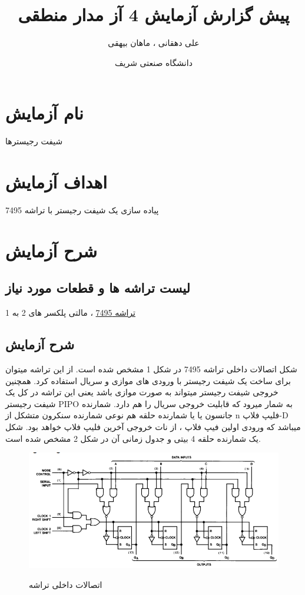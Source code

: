 \documentclass[twoside]{article}
\title{\Huge پیش گزارش آزمایش 4 آز مدار منطقی }
\author{\Large علی دهقانی ، ماهان بیهقی}
\date{دانشگاه صنعتی شریف}
\begin{document}
	\maketitle
	\newpage
	\section*{نام آزمایش}
	شیفت رجیسترها
	
	\section*{اهداف آزمایش}
	پیاده سازی یک شیفت رجیستر با تراشه 7495
	
	\section*{شرح آزمایش}
	
	\subsection*{لیست تراشه ها و قطعات مورد نیاز}
	\href{https://www.jameco.com/Jameco/Products/ProdDS/50770NSC.pdf}{تراشه 7495} ، مالتی پلکسر های 2 به 1
	
	\subsection*{شرح آزمایش}
	
	شکل اتصالات داخلی تراشه 7495 در شکل 1 مشخص شده است. از این تراشه میتوان برای ساخت یک شیفت رجیستر با ورودی های موازی و سریال استفاده کرد. همچنین خروجی شیفت رجیستر میتواند به صورت موازی باشد یعنی این تراشه در کل یک شیفت رجیستر PIPO به شمار میرود که قابلیت خروجی سریال را هم دارد.
	شمارنده جانسون یا یا شمارنده حلقه هم نوعی شمارنده سنکرون متشکل از n فلیپ فلاپ-D میباشد که ورودی اولین فیپ فلاپ ، از نات خروجی آخرین فلیپ فلاپ خواهد بود. شکل یک شمارنده حلقه 4 بیتی و جدول زمانی آن در شکل 2 مشخص شده است.
	\begin{figure}[h!]
		\begin{center}
			\includegraphics[scale=0.60]{7495_logic_diagram}‎
			\caption{اتصالات داخلی تراشه}
		\end{center}
	\end{figure} 
\end{document}

